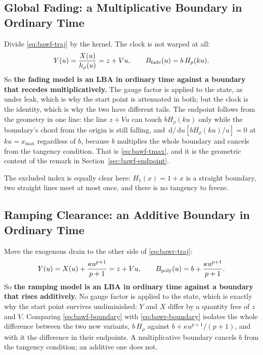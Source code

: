 \documentclass[12pt]{article}
\newcommand{\dd}{\,\mathrm{d}}
\theoremstyle{remark}
\begin{document}
\subsection{Global Fading: a Multiplicative Boundary in Ordinary Time}
Divide \eqref{eq:bawf-traj} by the kernel. The clock is not warped at all:
\begin{equation}
  Y(u) = \frac{X(u)}{h_\rho(u)} = z + Vu,
  \qquad
  B_{\rm fade}(u) = b\,H_\rho(ku).
  \label{eq:bawf-boundary}
\end{equation}
So \textbf{the fading model is an LBA in ordinary time against a boundary that recedes multiplicatively.} The gauge factor is applied to the state, as under leak, which is why the start point is attenuated in both; but the clock is the identity, which is why the two have different tails. The endpoint follows from the geometry in one line: the line $z+Vu$ can touch $bH_\rho(ku)$ only while the boundary's chord from the origin is still falling, and $\dd/\dd u\left[bH_\rho(ku)/u\right]=0$ at $ku=x_{\max}$ regardless of $b$, because $b$ multiplies the whole boundary and cancels from the tangency condition. That is \eqref{eq:bawf-tmax}, and it is the geometric content of the remark in Section~\ref{sec:bawf-endpoint}.

The excluded index is equally clear here: $H_1(x)=1+x$ is a straight boundary, two straight lines meet at most once, and there is no tangency to freeze.

\subsection{Ramping Clearance: an Additive Boundary in Ordinary Time}
Move the exogenous drain to the other side of \eqref{eq:bawr-traj}:
\begin{equation}
  Y(u) = X(u) + \frac{\kappa u^{p+1}}{p+1} = z + Vu,
  \qquad
  B_{\rm poly}(u) = b + \frac{\kappa u^{p+1}}{p+1}.
  \label{eq:bawr-boundary}
\end{equation}
So \textbf{the ramping model is an LBA in ordinary time against a boundary that rises additively.} No gauge factor is applied to the state, which is exactly why the start point survives undiminished: $Y$ and $X$ differ by a quantity free of $z$ and $V$. Comparing \eqref{eq:bawf-boundary} with
\eqref{eq:bawr-boundary} isolates the whole difference between the two new
variants, $b\,H_\rho$ against $b+\kappa u^{p+1}/(p+1)$, and with it the difference in their endpoints. A multiplicative boundary cancels $b$ from the tangency condition; an additive one does not.
\end{document}
